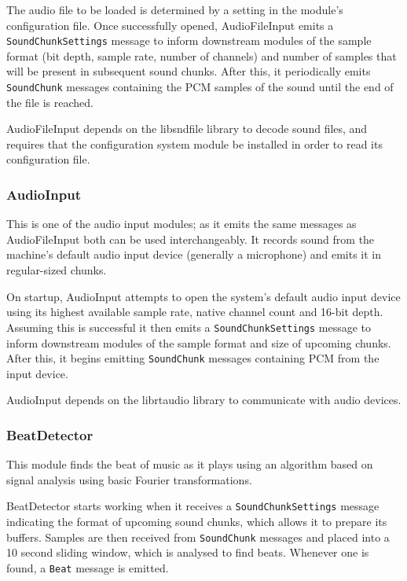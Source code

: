 \documentclass[english,12pt]{scrartcl}
\begin{document}
				The audio file to be loaded is determined by a setting in the module's
				configuration file. Once successfully opened, AudioFileInput emits a
				\texttt{SoundChunkSettings} message to inform downstream modules of the sample
				format (bit depth, sample rate, number of channels)	and number of samples that
				will be present in subsequent sound chunks. After this, it periodically emits
				\texttt{SoundChunk} messages containing the PCM samples of the sound until
				the end of the file is reached.

				AudioFileInput depends on the libsndfile library to decode sound files, and
				requires that the configuration system module be installed in order to read its
				configuration file.


			\subsubsection{AudioInput}
				This is one of the audio input modules; as it emits the same messages as
				AudioFileInput both can be used interchangeably. It records sound from the
				machine's default audio input device (generally a microphone) and emits it in
				regular-sized chunks.

				On startup, AudioInput attempts to open the system's default audio input device
				using its highest available sample rate, native channel count and 16-bit depth.
				Assuming this is successful it then emits a \texttt{SoundChunkSettings} message
				to inform downstream modules of the sample format and size of upcoming chunks.
				After this, it begins emitting \texttt{SoundChunk} messages containing PCM from
				the input device.

				AudioInput depends on the librtaudio library to communicate with audio devices.


			\subsubsection{BeatDetector}
				This module finds the beat of music as it plays using an algorithm based on signal analysis using basic Fourier transformations.

				BeatDetector starts working when it receives a \texttt{SoundChunkSettings} message
				indicating the format of upcoming sound chunks, which allows it to prepare its
				buffers. Samples are then received from \texttt{SoundChunk} messages and placed
				into a 10 second sliding window, which is analysed to find beats. Whenever one is
				found, a \texttt{Beat} message is emitted.
\end{document}

